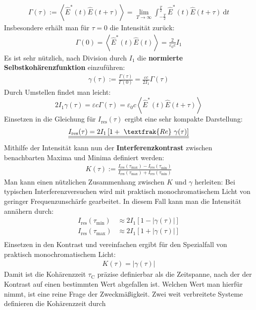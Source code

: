 \documentclass[german,  %
parskip=full,  %
]{scrartcl}
\begin{document}
\begin{align}
\Gamma(\tau) := \left\langle\hat{E}^{*}(t)\hat{E}(t+\tau)\right\rangle = \lim_{T\rightarrow\infty} \int_{-\frac{T}{2}}^{\frac{T}{2}} \hat{E}^{*}(t)\hat{E}(t+\tau) \ \mathrm{d}t
\end{align}
Insbesondere erhält man für \(\tau=0\) die Intensität zurück:
\begin{align*}
\Gamma(0) = \left\langle\hat{E}^{*}(t)\hat{E}(t)\right\rangle = \frac{2}{\varepsilon_0 c}I_1
\end{align*}
Es ist sehr nützlich, nach Division durch \(I_1\) die \textbf{normierte Selbstkohärenzfunktion} einzuführen:
\begin{align}
\gamma(\tau) := \frac{\Gamma(\tau)}{\Gamma(0)} = \frac{\varepsilon c}{2I_1}\Gamma(\tau)
\end{align}
Durch Umstellen findet man leicht:
\[2I_1\gamma(\tau) =  \varepsilon c \Gamma(\tau)= \varepsilon_0 c \left\langle\hat{E}^{*}(t)\hat{E}(t+\tau)\right\rangle \]
Einsetzen in die Gleichung für \(I_{\mathrm{res}}(\tau)\) ergibt eine sehr kompakte Darstellung:
\begin{align}
\underline{\underline{I_{\mathrm{res}}(\tau) = 2I_1 \left[ 1 +  \ \textfrak{Re} \ \gamma(\tau)\right]}}
\end{align}
Mithilfe der Intensität kann nun der \textbf{Interferenzkontrast} zwischen benachbarten Maxima und Minima definiert werden:
\begin{align}
K(\tau) := \frac{I_{\mathrm{res}}(\tau_{\mathrm{max}}) - I_{\mathrm{res}}(\tau_{\mathrm{min}}) }{I_{\mathrm{res}}(\tau_{\mathrm{max}}) + I_{\mathrm{res}}(\tau_{\mathrm{min}}) }
\end{align}
Man kann einen nützlichen Zusammenhang zwischen \(K\) und \(\gamma\) herleiten: Bei typischen Interferenzversuchen wird mit praktisch monochromatischem Licht von geringer Frequenzunschärfe gearbeitet. In diesem Fall kann man die Intensität annähern durch:
\begin{align*}
I_{\mathrm{res}}(\tau_{\mathrm{min}}) &\approx 2I_1 \left[ 1 -  |\gamma(\tau)|\right] \\
I_{\mathrm{res}}(\tau_{\mathrm{max}}) &\approx 2I_1 \left[ 1 +  |\gamma(\tau)|\right] \\
\end{align*}
Einsetzen in den Kontrast und vereinfachen ergibt für den Spezialfall von praktisch monochromatischem Licht:
\begin{align}
K(\tau) = |\gamma(\tau)|
\end{align}
Damit ist die Kohärenzzeit \(\tau_{\mathrm{C}}\) präzise definierbar als die Zeitspanne, nach der der Kontrast auf einen bestimmten Wert abgefallen ist. Welchen Wert man hierfür nimmt, ist eine reine Frage der Zweckmäßigkeit. Zwei weit verbreitete Systeme definieren die Kohärenzzeit durch
\end{document}
